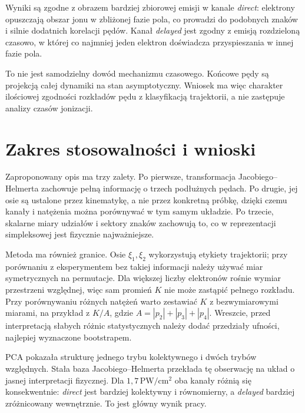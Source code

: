 \documentclass[12pt,letterpaper,oneside]{report}
\numberwithin{equation}{chapter}
\numberwithin{figure}{chapter}
\numberwithin{table}{chapter}
\begin{document}
Wyniki są zgodne z obrazem bardziej zbiorowej emisji w kanale
\textit{direct}: elektrony opuszczają obszar jonu w zbliżonej fazie pola,
co prowadzi do podobnych znaków i silnie dodatnich korelacji pędów.
Kanał \textit{delayed} jest zgodny z emisją rozdzieloną czasowo, w której
co najmniej jeden elektron doświadcza przyspieszania w innej fazie pola.

To nie jest samodzielny dowód mechanizmu czasowego. Końcowe pędy są
projekcją całej dynamiki na stan asymptotyczny. Wniosek ma więc charakter
ilościowej zgodności rozkładów pędu z klasyfikacją trajektorii, a nie
zastępuje analizy czasów jonizacji.

\chapter{Zakres stosowalności i wnioski}

Zaproponowany opis ma trzy zalety. Po pierwsze, transformacja
Jacobiego--Helmerta zachowuje pełną informację o trzech podłużnych
pędach. Po drugie, jej osie są ustalone przez kinematykę, a nie przez
konkretną próbkę, dzięki czemu kanały i natężenia można porównywać w tym
samym układzie. Po trzecie, skalarne miary udziałów i sektory znaków
zachowują to, co w reprezentacji simpleksowej jest fizycznie
najważniejsze.

Metoda ma również granice. Osie \(\xi_1,\xi_2\) wykorzystują etykiety
trajektorii; przy porównaniu z eksperymentem bez takiej informacji należy
używać miar symetrycznych na permutacje. Dla większej liczby elektronów
rośnie wymiar przestrzeni względnej, więc sam promień \(K\) nie może
zastąpić pełnego rozkładu. Przy porównywaniu różnych natężeń warto
zestawiać \(K\) z bezwymiarowymi miarami, na przykład z \(K/A\), gdzie
\(A=|p_2|+|p_3|+|p_4|\). Wreszcie, przed interpretacją słabych różnic
statystycznych należy dodać przedziały ufności, najlepiej wyznaczone
bootstrapem.

PCA pokazała strukturę jednego trybu kolektywnego i dwóch trybów
względnych. Stała baza Jacobiego--Helmerta przekłada tę obserwację na
układ o jasnej interpretacji fizycznej. Dla \(1{,}7\,\mathrm{PW/cm^2}\)
oba kanały różnią się konsekwentnie: \textit{direct} jest bardziej
kolektywny i równomierny, a \textit{delayed} bardziej zróżnicowany
wewnętrznie. To jest główny wynik pracy.
\end{document}
